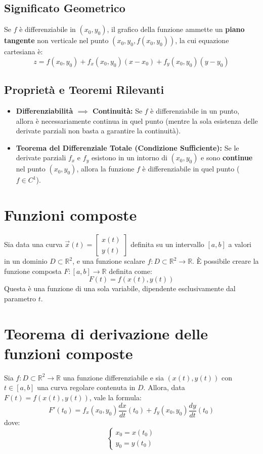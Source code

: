 \subsection*{Significato Geometrico}
Se $f$ è differenziabile in $(x_0, y_0)$, il grafico della funzione ammette un \textbf{piano tangente} non verticale nel punto $(x_0, y_0, f(x_0, y_0))$, la cui equazione cartesiana è:
\begin{equation*}
    z = f(x_0, y_0) + f_x(x_0, y_0)(x - x_0) + f_y(x_0, y_0)(y - y_0)
\end{equation*}

\subsection{Proprietà e Teoremi Rilevanti}
\begin{itemize}
    \item \textbf{Differenziabilità $\implies$ Continuità:} Se $f$ è differenziabile in un punto, allora è necessariamente continua in quel punto (mentre la sola esistenza delle derivate parziali non basta a garantire la continuità).
    \item \textbf{Teorema del Differenziale Totale (Condizione Sufficiente):} Se le derivate parziali $f_x$ e $f_y$ esistono in un intorno di $(x_0, y_0)$ e sono \textbf{continue} nel punto $(x_0, y_0)$, allora la funzione $f$ è differenziabile in quel punto ($f \in C^1$).
\end{itemize}

\section{Funzioni composte}
Sia data una curva $\vec{x}(t) = \begin{bmatrix} x(t) \\ y(t) \end{bmatrix}$ definita su un intervallo $[a,b]$ a valori in un dominio $D \subset \mathbb{R}^2$, e una funzione scalare $f: D \subset \mathbb{R}^2 \to \mathbb{R}$.
È possibile creare la funzione composta $F: [a,b] \to \mathbb{R}$ definita come:
\[ F(t) = f(x(t), y(t)) \]
Questa è una funzione di una sola variabile, dipendente esclusivamente dal parametro $t$.

\section{Teorema di derivazione delle funzioni composte}
Sia $f: D \subset \mathbb{R}^2 \to \mathbb{R}$ una funzione differenziabile e sia $(x(t), y(t))$ con $t \in [a,b]$ una curva regolare contenuta in $D$.
Allora, data $F(t) = f(x(t), y(t))$, vale la formula:
\[ F'(t_0) = f_x(x_0, y_0) \frac{dx}{dt}(t_0) + f_y(x_0, y_0) \frac{dy}{dt}(t_0) \]
dove:
\[
\begin{cases}
x_0 = x(t_0) \\
y_0 = y(t_0)
\end{cases}
\]


